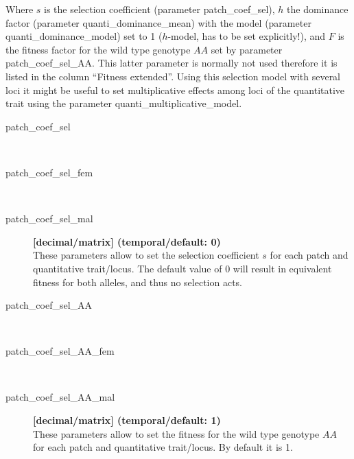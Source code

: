 \documentclass[letterpaper,12pt,oneside]{book}
\begin{document}
Where $s$ is the selection coefficient (parameter \textsf{patch\_coef\_sel}), $h$ the dominance factor (parameter \textsf{quanti\_dominance\_mean}) with the model (parameter \textsf{quanti\_dominance\_model}) set to 1 ($h$-model, has to be set explicitly!), and $F$ is the fitness factor for the wild type genotype $AA$ set by parameter \textsf{patch\_coef\_sel\_AA}. This latter parameter is normally not used therefore it is listed in the column “Fitness extended”. Using this selection model with several loci it might be useful to set multiplicative effects among loci of the quantitative trait using the parameter \textsf{quanti\_multiplicative\_model}.
\begin{description}
\item[patch\_coef\_sel]\hspace*{\fill}\\
\vspace{-9mm}
\item[patch\_coef\_sel\_fem]\hspace*{\fill}\\
\vspace{-9mm}
\item[patch\_coef\_sel\_mal]\textbf{[decimal/matrix] (temporal/default: 0)}\\
These parameters allow to set the selection coefficient $s$ for each patch and quantitative trait/locus. The default value of 0 will result in equivalent fitness for both alleles, and thus no selection acts.

\item[patch\_coef\_sel\_AA]\hspace*{\fill}\\
\vspace{-9mm}
\item[patch\_coef\_sel\_AA\_fem]\hspace*{\fill}\\
\vspace{-9mm}
\item[patch\_coef\_sel\_AA\_mal]\textbf{[decimal/matrix] (temporal/default: 1)}\\
These parameters allow to set the fitness for the wild type genotype $AA$ for each patch and quantitative trait/locus. By default it is 1.
\end{description}
\end{document}
